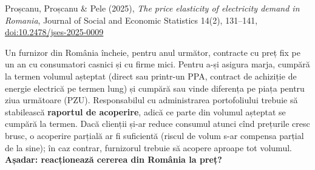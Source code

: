 
\renewcommand{\emqacase}{\T{Research case 5 (Lecture 5)}{Studiul de caz 5 (cursul 5)}}

%
          { Proșcanu, Proșcanu \& Pele (2025), \emph{The price elasticity of electricity demand in Romania},
           Journal of Social and Economic Statistics 14(2), 131--141, \href{https://doi.org/10.2478/jses-2025-0009}{doi:10.2478/jses-2025-0009}}

\begin{scenario}
%
{Un furnizor din România încheie, pentru anul următor, contracte cu preț fix pe un an cu consumatori casnici și cu firme mici.
Pentru a-și asigura marja, cumpără la termen volumul așteptat (direct sau printr-un PPA, contract de achiziție de energie electrică pe termen lung) și cumpără sau vinde diferența pe piața pentru ziua următoare (PZU).
Responsabilul cu administrarea portofoliului trebuie să stabilească \textbf{raportul de acoperire}, adică ce parte din volumul așteptat se cumpără la termen.
Dacă clienții și-ar reduce consumul atunci cînd prețurile cresc brusc, o acoperire parțială ar fi suficientă (riscul de volum s-ar compensa parțial de la sine); în caz contrar, furnizorul trebuie să acopere aproape tot volumul.
\textbf{Așadar: reacționează cererea din România la preț?}}
\end{scenario}

